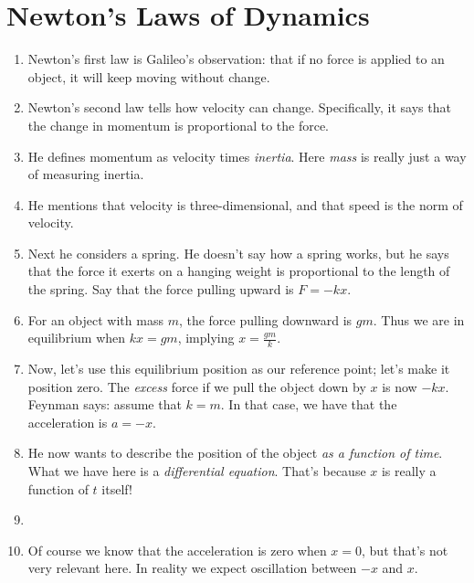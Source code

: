 \section{Newton's Laws of Dynamics}

\begin{enumerate}

  \item Newton's first law is Galileo's observation: that if no force is
  applied to an object, it will keep moving without change.

  \item Newton's second law tells how velocity can change. Specifically,
  it says that the change in momentum is proportional to the force.

  \item He defines momentum as velocity times \emph{inertia}. Here
  \emph{mass} is really just a way of measuring inertia.

  \item He mentions that velocity is three-dimensional, and that speed
  is the norm of velocity.

  \item Next he considers a spring. He doesn't say how a spring works,
  but he says that the force it exerts on a hanging weight is
  proportional to the length of the spring. Say that the force pulling
  upward is $F = -kx$.

  \item For an object with mass $m$, the force pulling downward is $gm$.
  Thus we are in equilibrium when $kx = gm$, implying $x =
  \frac{gm}{k}$.

  \item Now, let's use this equilibrium position as our reference point;
  let's make it position zero. The \emph{excess} force if we pull the
  object down by $x$ is now $-kx$. Feynman says: assume that $k = m$. In
  that case, we have that the acceleration is $a = -x$.

  \item He now wants to describe the position of the object \emph{as a
  function of time}. What we have here is a \emph{differential
  equation}. That's because $x$ is really a function of $t$ itself!

  \item {}

  \item Of course we know that the acceleration is zero when $x = 0$,
  but that's not very relevant here. In reality we expect oscillation
  between $-x$ and $x$.


\end{enumerate}
